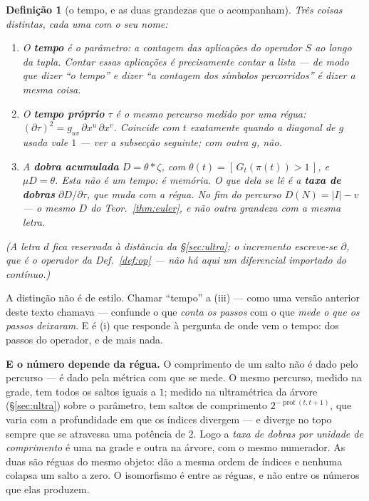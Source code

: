 \documentclass[11pt,a4paper]{article}
\newcommand{\abs}[1]{\lvert #1\rvert}
\newtheorem{definicao}[teorema]{Definição}
\begin{document}
\begin{definicao}[o tempo, e as duas grandezas que o acompanham]\label{def:tempo}
Três coisas distintas, cada uma com o seu nome:
\begin{enumerate}\itemsep3pt
\item[(i)] O \textbf{tempo} é o parâmetro: a \emph{contagem das aplicações do
      operador} $S$ ao longo da tupla. Contar essas aplicações é precisamente
      contar a lista --- de modo que dizer ``o tempo'' e dizer ``a contagem dos
      símbolos percorridos'' é dizer a mesma coisa.
\item[(ii)] O \textbf{tempo próprio} $\tau$ é o mesmo percurso \emph{medido por
      uma régua}: $(\partial\tau)^{2}=g_{uv}\,\partial x^{u}\,\partial x^{v}$. Coincide com $t$ exatamente quando
      a diagonal de $g$ usada vale $1$ --- ver a subsecção seguinte; com outra
      $g$, não.
\item[(iii)] A \textbf{dobra acumulada} $D=\theta*\zeta$, com
      $\theta(t)=[\,G_{t}(\pi(t))>1\,]$, e $\mu D=\theta$. Esta \emph{não} é um
      tempo: é memória. O que dela se lê é a \textbf{taxa de dobras} $\partial D/\partial\tau$,
      que muda com a régua. No fim do percurso $D(N)=\abs{I}-v$ --- o mesmo $D$
      do Teor.~\ref{thm:euler}, e não outra grandeza com a mesma letra.
\end{enumerate}
(A letra $d$ fica reservada à distância da §\ref{sec:ultra}; o \emph{incremento}
escreve-se $\partial$, que é o operador da Def.~\ref{def:op} --- não há aqui um
diferencial importado do contínuo.)
\end{definicao}

\medskip\noindent A distinção não é de estilo. Chamar ``tempo'' a (iii) --- como
uma versão anterior deste texto chamava --- confunde o que \emph{conta os
passos} com o que \emph{mede o que os passos deixaram}. E é (i) que responde à
pergunta de onde vem o tempo: dos passos do operador, e de mais nada.

\medskip\noindent\textbf{E o número depende da régua.} O comprimento de um salto
não é dado pelo percurso --- é dado pela métrica com que se mede. O mesmo
percurso, medido na grade, tem todos os saltos iguais a $1$; medido na
ultramétrica da árvore (§\ref{sec:ultra}) sobre o parâmetro, tem saltos de
comprimento $2^{-\operatorname{prof}(t,t+1)}$, que varia com a profundidade em que os índices
divergem --- e diverge no topo sempre que se atravessa uma potência de $2$. Logo
a \emph{taxa de dobras por unidade de comprimento} é uma na grade e outra na
árvore, com o mesmo numerador. As duas são réguas do mesmo objeto: dão a mesma
ordem de índices e nenhuma colapsa um salto a zero. O isomorfismo é entre as
réguas, e não entre os números que elas produzem.
\end{document}
